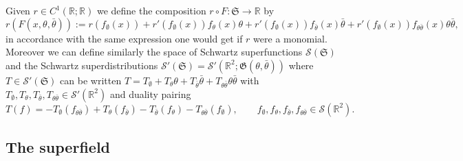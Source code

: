 \documentclass[a4paper,10pt]{article}
\newcommand{\assign}{:=}
\begin{document}
Given $r \in C^1 (\mathbb{R}; \mathbb{R})$ we define the composition $r \circ
F : \mathfrak{S} \rightarrow \mathbb{R}$ by
\[ r (F (x, \theta, \bar{\theta})) \assign r (f_{\emptyset} (x)) + r'
   (f_{\emptyset} (x)) f_{\theta} (x) \theta + r' (f_{\emptyset} (x))
   f_{\bar{\theta}} (x) \bar{\theta} + r' (f_{\emptyset} (x)) f_{\theta
   \bar{\theta}} (x) \theta \bar{\theta}, \]
in accordance with the same expression one would get if $r$ were a monomial.
Moreover we can define similarly the space of Schwartz superfunctions
$\mathcal{S} (\mathfrak{S})$ and the Schwartz superdistributions $\mathcal{S}'
(\mathfrak{S}) =\mathcal{S}' (\mathbb{R}^2 ; \mathfrak{G} (\theta,
\bar{\theta}))$ where $T \in \mathcal{S}' (\mathfrak{S})$ can be written $T =
T_{\emptyset} + T_{\theta} \theta + T_{\bar{\theta}} \bar{\theta} + T_{\theta
\bar{\theta}} \theta \bar{\theta}$ with $T_{\emptyset}, T_{\theta},
T_{\bar{\theta}}, T_{\theta \bar{\theta}} \in \mathcal{S}' (\mathbb{R}^2)$ and
duality pairing
\[ T (f) = - T_{\emptyset} (f_{\theta \bar{\theta}}) + T_{\theta}
   (f_{\bar{\theta}}) - T_{\bar{\theta}} (f_{\theta}) - T_{\theta
   \bar{\theta}} (f_{\emptyset}), \qquad f_{\emptyset}, f_{\theta},
   f_{\bar{\theta}}, f_{\theta \bar{\theta}} \in \mathcal{S} (\mathbb{R}^2) .
\]

\subsection{The superfield}
\end{document}
